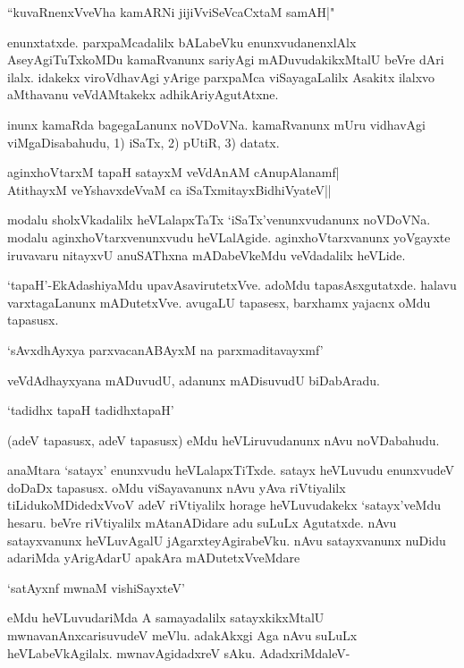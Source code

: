 \begin{shloka}
``kuvaRnenxVveVha kamARNi jijiVviSeVcaCxtaM samAH|"
\end{shloka}

enunxtatxde. parxpaMcadalilx bALabeVku enunxvudanenxlAlx AseyAgiTuTxkoMDu kamaRvanunx sariyAgi mADuvudakikxMtalU beVre dAri ilalx. idakekx viroVdhavAgi yArige parxpaMca viSayagaLalilx Asakitx ilalxvo aMthavanu veVdAMtakekx adhikAriyAgutAtxne.

inunx kamaRda bagegaLanunx noVDoVNa. kamaRvanunx mUru vidhavAgi viMgaDisabahudu, 1) iSaTx, 2) pUtiR, 3) datatx.

\begin{shloka}
aginxhoVtarxM tapaH satayxM veVdAnAM cAnupAlanamf|\\
AtithayxM veYshavxdeVvaM ca iSaTxmitayxBidhiVyateV||
\end{shloka}

modalu sholxVkadalilx heVLalapxTaTx `iSaTx'venunxvudanunx noVDoVNa. modalu aginxhoVtarxvenunxvudu heVLalAgide. aginxhoVtarxvanunx yoVgayxte iruvavaru nitayxvU anuSAThxna mADabeVkeMdu veVdadalilx heVLide.

`tapaH'-EkAdashiyaMdu upavAsavirutetxVve. adoMdu tapasAsxgutatxde. halavu varxtagaLanunx mADutetxVve. avugaLU tapasesx, barxhamx yajacnx oMdu tapasusx.

\begin{shloka}
`sAvxdhAyxya parxvacanABAyxM na parxmaditavayxmf'
\end{shloka}

veVdAdhayxyana mADuvudU, adanunx mADisuvudU biDabAradu.

\begin{shloka}
`tadidhx tapaH tadidhxtapaH'
\end{shloka}

(adeV tapasusx, adeV tapasusx) eMdu heVLiruvudanunx nAvu noVDabahudu.

anaMtara `satayx' enunxvudu heVLalapxTiTxde. satayx heVLuvudu enunxvudeV doDaDx tapasusx. oMdu viSayavanunx nAvu yAva riVtiyalilx tiLidukoMDidedxVvoV adeV riVtiyalilx horage heVLuvudakekx `satayx'veMdu hesaru. beVre riVtiyalilx mAtanADidare adu suLuLx Agutatxde. nAvu satayxvanunx heVLuvAgalU jAgarxteyAgirabeVku. nAvu satayxvanunx nuDidu adariMda yArigAdarU apakAra mADutetxVveMdare

\begin{shloka}
`satAyxnf mwnaM vishiSayxteV'
\end{shloka}

eMdu heVLuvudariMda A samayadalilx satayxkikxMtalU mwnavanAnxcarisuvudeV meVlu. adakAkxgi Aga nAvu suLuLx heVLabeVkAgilalx. mwnavAgidadxreV sAku. AdadxriMdaleV-

